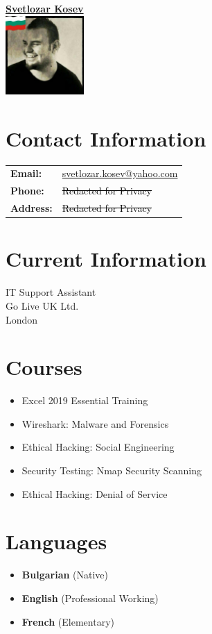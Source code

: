 \documentclass[letterpaper,10pt]{article}
\begin{document}
	
	\begin{minipage}[t]{0.45\textwidth}
		\begin{center}
			\Large\textbf{\href{https://www.linkedin.com/in/svetlozar-kosev-m-sc-it-278058144/}{Svetlozar Kosev}}\\[2ex]
			\includegraphics[width=3cm,height=3cm]{your_photo.jpg}
		\end{center}
		
		\section*{Contact Information}
		\begin{tabular}{@{}l l}
			\textbf{Email:} & \href{mailto:svetlozar.kosev@}{svetlozar.kosev@yahoo.com} \\
			\textbf{Phone:} & \textcolor{black}{\st{Redacted for Privacy}} \\
			\textbf{Address:} & \textcolor{black}{\st{Redacted for Privacy}} \\
		\end{tabular}
		
		\section*{Current Information}
		IT Support Assistant \\
		Go Live UK Ltd. \\
		London \\
		
		\section*{Courses}
		\begin{itemize}
			\item Excel 2019 Essential Training
			\item Wireshark: Malware and Forensics
			\item Ethical Hacking: Social Engineering
			\item Security Testing: Nmap Security Scanning
			\item Ethical Hacking: Denial of Service
		\end{itemize}
		
		\section*{Languages}
		\begin{itemize}
			\item \textbf{Bulgarian} (Native)
			\item \textbf{English} (Professional Working)
			\item \textbf{French} (Elementary)
		\end{itemize}
	\end{minipage}
\end{document}
